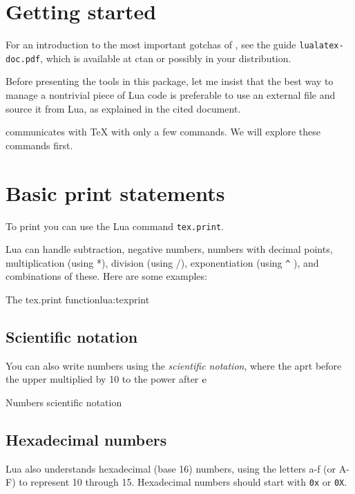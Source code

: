 \section{Getting started}

For an introduction to the most important gotchas of \cmd{\directlua}, see the guide \texttt{lualatex-doc.pdf}, which is available at ctan or possibly in your distribution.

Before presenting the tools in this package, let me insist that the best way to manage a nontrivial piece of Lua code is preferable to use an external file and source it from Lua, as explained in the cited document.

\LuaTeX communicates with TeX with only a few commands. We will explore these commands first.

\section{Basic print statements}

To print you can use the Lua command \lstinline{tex.print}.


Lua can handle subtraction, negative numbers, numbers with decimal points, multiplication (using *),
division (using /), exponentiation (using \texttt{\^} ), and combinations of these. Here are some examples:
\begin{texexample}{The tex.print function}{lua:texprint}
\end{texexample}

\subsection{Scientific notation}

You can also write numbers using the \textit{scientific notation}, where the aprt before the upper multiplied by 10 to the power after $\textup{e}$

\begin{texexample}{Numbers scientific notation}{}
\end{texexample}

\subsection{Hexadecimal numbers}
Lua also understands hexadecimal (base 16) numbers, using the letters
a-f (or A-F) to represent 10 through 15. Hexadecimal numbers should start with \texttt{0x} or \texttt{0X}.
\begin{tcblisting}{}
\end{tcblisting}


